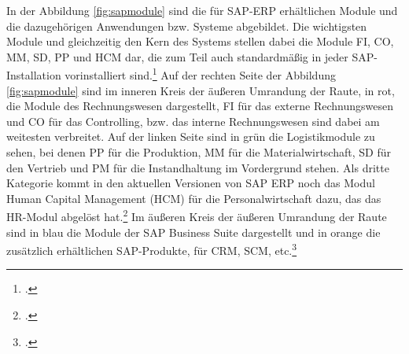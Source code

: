 In der Abbildung \ref{fig:sapmodule} sind die für SAP-ERP erhältlichen Module und die dazugehörigen Anwendungen bzw. Systeme abgebildet. Die wichtigsten Module und gleichzeitig den Kern des Systems stellen dabei die Module FI, CO, MM, SD, PP und HCM dar, die zum Teil auch standardmäßig in jeder SAP-Installation vorinstalliert sind.\footcite[Vgl.][S. 8]{sap-für-wp} Auf der rechten Seite der Abbildung \ref{fig:sapmodule} sind im inneren Kreis der äußeren Umrandung der Raute, in rot, die Module des Rechnungswesen dargestellt, FI für das externe Rechnungswesen und CO für das Controlling, bzw. das interne Rechnungswesen sind dabei am weitesten verbreitet. Auf der linken Seite sind in grün die Logistikmodule zu sehen, bei denen PP für die Produktion, MM für die Materialwirtschaft, SD für den Vertrieb und PM für die Instandhaltung im Vordergrund stehen. Als dritte Kategorie kommt in den aktuellen Versionen von SAP ERP noch das Modul Human Capital Management (HCM) für die Personalwirtschaft dazu, das das HR-Modul abgelöst hat.\footcite[Vgl.][]{sap-module2} Im äußeren Kreis der äußeren Umrandung der Raute sind in blau die Module der SAP Business Suite dargestellt und in orange die zusätzlich erhältlichen SAP-Produkte, für CRM, SCM, etc.\footcite[Vgl.][]{sap-module}

